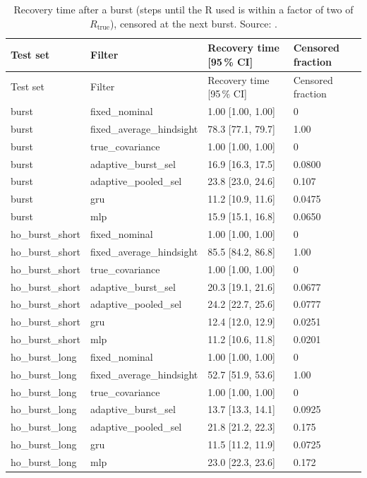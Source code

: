 {\scriptsize
\begin{longtable}{llll}
\caption{Recovery time after a burst (steps until the R used is within a factor of two of $R_{\mathrm{true}}$), censored at the next burst. Source: .}\label{tab:nr_recovery}\\
\toprule
Test set & Filter & Recovery time [95\,\% CI] & Censored fraction \\
\midrule
\endfirsthead
\toprule
Test set & Filter & Recovery time [95\,\% CI] & Censored fraction \\
\midrule
\endhead
burst & fixed\_nominal & 1.00 [1.00, 1.00] & 0 \\
burst & fixed\_average\_hindsight & 78.3 [77.1, 79.7] & 1.00 \\
burst & true\_covariance & 1.00 [1.00, 1.00] & 0 \\
burst & adaptive\_burst\_sel & 16.9 [16.3, 17.5] & 0.0800 \\
burst & adaptive\_pooled\_sel & 23.8 [23.0, 24.6] & 0.107 \\
burst & gru & 11.2 [10.9, 11.6] & 0.0475 \\
burst & mlp & 15.9 [15.1, 16.8] & 0.0650 \\
ho\_burst\_short & fixed\_nominal & 1.00 [1.00, 1.00] & 0 \\
ho\_burst\_short & fixed\_average\_hindsight & 85.5 [84.2, 86.8] & 1.00 \\
ho\_burst\_short & true\_covariance & 1.00 [1.00, 1.00] & 0 \\
ho\_burst\_short & adaptive\_burst\_sel & 20.3 [19.1, 21.6] & 0.0677 \\
ho\_burst\_short & adaptive\_pooled\_sel & 24.2 [22.7, 25.6] & 0.0777 \\
ho\_burst\_short & gru & 12.4 [12.0, 12.9] & 0.0251 \\
ho\_burst\_short & mlp & 11.2 [10.6, 11.8] & 0.0201 \\
ho\_burst\_long & fixed\_nominal & 1.00 [1.00, 1.00] & 0 \\
ho\_burst\_long & fixed\_average\_hindsight & 52.7 [51.9, 53.6] & 1.00 \\
ho\_burst\_long & true\_covariance & 1.00 [1.00, 1.00] & 0 \\
ho\_burst\_long & adaptive\_burst\_sel & 13.7 [13.3, 14.1] & 0.0925 \\
ho\_burst\_long & adaptive\_pooled\_sel & 21.8 [21.2, 22.3] & 0.175 \\
ho\_burst\_long & gru & 11.5 [11.2, 11.9] & 0.0725 \\
ho\_burst\_long & mlp & 23.0 [22.3, 23.6] & 0.172 \\
\bottomrule
\end{longtable}
}
